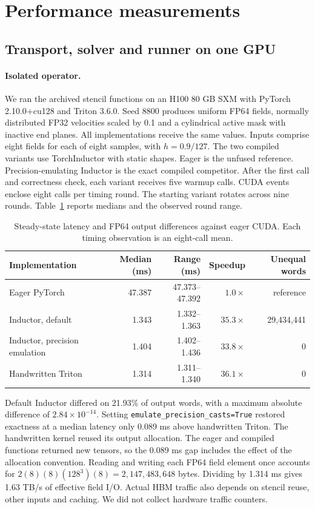\documentclass{article}
\newcommand{\code}[1]{\texttt{#1}}
\begin{document}
\section{Performance measurements}\label{sec:timings}
\subsection{Transport, solver and runner on one GPU}
\paragraph{Isolated operator.}
We ran the archived stencil functions on an H100 80 GB SXM with PyTorch 2.10.0+cu128 and Triton 3.6.0. Seed 8800 produces uniform FP64 fields, normally distributed FP32 velocities scaled by 0.1 and a cylindrical active mask with inactive end planes. All implementations receive the same values. Inputs comprise eight fields for each of eight samples, with $h=0.9/127$. The two compiled variants use TorchInductor with static shapes. Eager is the unfused reference. Precision-emulating Inductor is the exact compiled competitor. After the first call and correctness check, each variant receives five warmup calls. CUDA events enclose eight calls per timing round. The starting variant rotates across nine rounds. Table~\ref{tab:stencil} reports medians and the observed round range.

\begin{table}[ht]\centering\small
\caption{Steady-state latency and FP64 output differences against eager CUDA. Each timing observation is an eight-call mean.}\label{tab:stencil}
\begin{tabular}{lrrrr}\toprule
Implementation & Median (ms) & Range (ms) & Speedup & Unequal words\\\midrule
Eager PyTorch &47.387&47.373--47.392&$1.0\times$&reference\\
Inductor, default &1.343&1.332--1.363&$35.3\times$&29,434,441\\
Inductor, precision emulation &1.404&1.402--1.436&$33.8\times$&0\\
Handwritten Triton &1.314&1.311--1.340&$36.1\times$&0\\\bottomrule
\end{tabular}
\end{table}

Default Inductor differed on 21.93\% of output words, with a maximum absolute difference of $2.84\times10^{-14}$. Setting \code{emulate\_precision\_casts=True} restored exactness at a median latency only 0.089 ms above handwritten Triton. The handwritten kernel reused its output allocation. The eager and compiled functions returned new tensors, so the 0.089 ms gap includes the effect of the allocation convention. Reading and writing each FP64 field element once accounts for $2(8)(8)(128^3)(8)=2{,}147{,}483{,}648$ bytes. Dividing by 1.314 ms gives 1.63 TB/s of effective field I/O. Actual HBM traffic also depends on stencil reuse, other inputs and caching. We did not collect hardware traffic counters.
\end{document}
